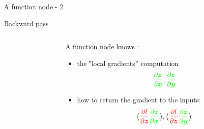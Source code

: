 \begin{frame}{A function node - 2}
  \begin{block}{Backward pass}
    \begin{columns}
    \begin{column}{0.4\textwidth}
    \begin{center}
    \end{center}
    \end{column}
    \begin{column}{0.6\textwidth}
      A function node knows : 
      \begin{itemize}
      \item the  "local gradients'' computation
        $$\color{green} \frac{\partial\boldsymbol{z}}{\partial{\ensuremath{\boldsymbol{x}}}}, \frac{\partial\boldsymbol{z}}{\partial{\ensuremath{\boldsymbol{y}}}}$$
      \item how to return the gradient  to the inputs: 
        $$\big( {\color{red} \frac{\partial l}{\partial\boldsymbol{z}}  }
        {\color{green} \frac{\partial\boldsymbol{z}}{\partial{\ensuremath{\boldsymbol{x}}}}}\big), 
        \big( {\color{red} \frac{\partial l}{\partial\boldsymbol{z}} }
        {\color{green} \frac{\partial\boldsymbol{z}}{\partial{\ensuremath{\boldsymbol{y}}}}}\big)$$
      \end{itemize}
    \end{column}
    \end{columns}
  \end{block}  
\end{frame}


